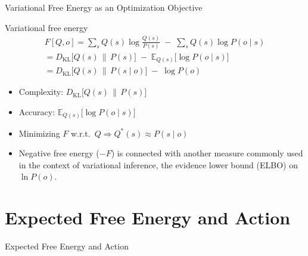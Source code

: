 \documentclass[aspectratio=1610, english]{beamer}
\begin{document}
\begin{frame}{Variational Free Energy as an Optimization Objective}
  \begin{block}{Variational free energy}
     \centering
        \begin{align*}
          F[Q,o]
          = \sum_{s}Q(s)\log\frac{Q(s)}{P(s)} \;-\;\sum_{s}Q(s)\log P(o\!\mid\!s) \\
          = D_{\mathrm{KL}}\bigl[Q(s)\,\|\,P(s)\bigr] \;-\;\mathbb{E}_{Q(s)}\bigl[\log P(o\!\mid\!s)\bigr] \\
          = D_{\mathrm{KL}}\bigl[Q(s)\,\|\,P(s\!\mid\!o)\bigr]\;-\;\log P(o)
        \end{align*}
  \end{block}

  \begin{itemize}
    \item Complexity: $D_{\mathrm{KL}}\bigl[Q(s)\,\|\,P(s)\bigr]$  
    \item Accuracy: $\mathbb{E}_{Q(s)}\bigl[\log P(o\!\mid\!s)\bigr]$  
    \item Minimizing \(F\) w.r.t.~\(Q \Rightarrow Q^*(s)\approx P(s\!\mid\!o)\)
    \item Negative free energy (\(-F\)) is connected with another measure commonly used in the context of variational inference, the evidence lower bound (ELBO) on \(\ln P(o)\).
  \end{itemize}
\end{frame}


\section{Expected Free Energy and Action}
\begin{frame}{Expected Free Energy and Action}
    \sectionpage
\end{frame}
\end{document}
